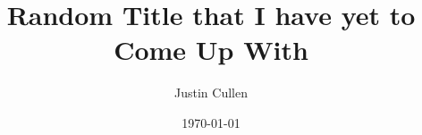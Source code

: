 \documentclass[a4paper]{article}
\begin{document}
\title{Random Title that I have yet to Come Up With}
\author{Justin Cullen}
\date{\today}
\maketitle
\end{document}

